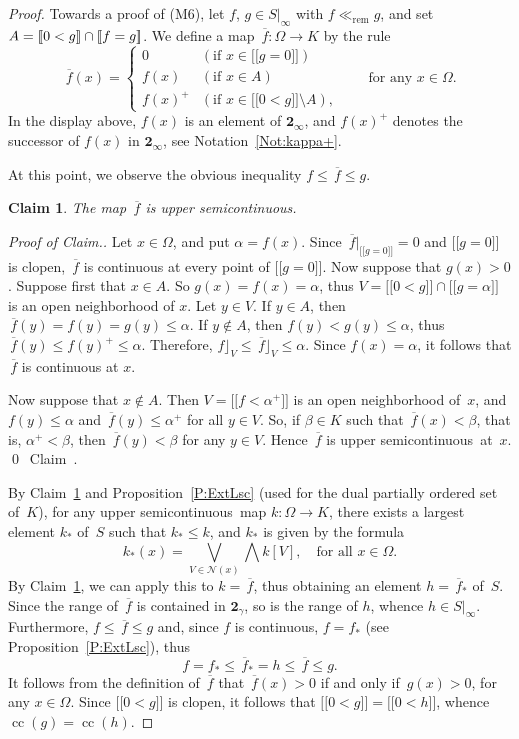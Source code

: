 \documentclass[psamsfonts,reqno]{memo-l}
\theoremstyle{plain}
\newtheorem{claim}{Claim}
\theoremstyle{definition}
\theoremstyle{remark}
\newcommand{\qedc}{{\qed}~{\rm Claim~{\theclaim}.}}
\newenvironment{cproof}
{\begin{proof}[Proof of Claim.]}
{\qedc\renewcommand{\qed}{}\end{proof}}
\numberwithin{equation}{section}
\newcommand{\two}{\mathbf{2}}
\newcommand{\Cn}{\mathbf{2}_{\infty}}
\newcommand{\Nh}{\mathcal{N}}
\renewcommand{\iff}{if and only if}
\newcommand{\ol}[1]{\,\overline{\!#1}}
\newcommand{\rem}{\ll_{\mathrm{rem}}}
\newcommand{\DI}[1]{#1|_{\infty}}
\newcommand{\usc}{upper semicontinuous}
\newcommand{\vbv}[1]{{[\![}#1{]\!]}}
\DeclareMathOperator{\cc}{cc}
\begin{document}
\begin{proof}
Towards a proof of (M6), let $f$, $g\in\DI{S}$ with $f\rem g$, and set
$A=\vbv{0\nobreak <\nobreak g}\cap\vbv{f\nobreak =\nobreak g}$.
We define a map $\ol{f}\colon\Omega\to K$ by
the rule
   \[
   \ol{f}(x)=
   \begin{cases}
   0&(\text{if }x\in\vbv{g=0})\\
   f(x)&(\text{if }x\in A)\\
   f(x)^+&(\text{if }x\in\vbv{0<g}\setminus A),
   \end{cases}
   \qquad\text{for any }x\in\Omega.
   \]
In the display above, $f(x)$ is an element of $\Cn$, and $f(x)^+$ denotes
the successor of $f(x)$ in $\Cn$, see Notation~\ref{Not:kappa+}.

At this point, we observe the obvious inequality $f\leq\ol{f}\leq g$.

\begin{claim}\label{Cl:olfusc}
The map $\ol{f}$ is \usc.
\end{claim}

\begin{cproof}
Let $x\in\Omega$, and put $\alpha=f(x)$. Since $\ol{f}|_{\vbv{g=0}}=0$ and
$\vbv{g=0}$ is clopen, $\ol{f}$ is continuous at every point of $\vbv{g=0}$.
Now suppose that $g(x)>0$. Suppose first that $x\in A$. So
$g(x)=f(x)=\alpha$, thus $V=\vbv{0<g}\cap\vbv{g=\alpha}$ is an open
neighborhood of $x$. Let $y\in V$. If $y\in A$, then
$\ol{f}(y)=f(y)=g(y)\leq\alpha$. If $y\notin A$, then $f(y)<g(y)\leq\alpha$,
thus $\ol{f}(y)\leq f(y)^+\leq\alpha$. Therefore,
$f\rfloor_V\leq\ol{f}\rfloor_V\leq\alpha$. Since $f(x)=\alpha$, it follows
that $\ol{f}$ is continuous at $x$.

Now suppose that $x\notin A$. Then $V=\vbv{f<\alpha^+}$ is an open
neighborhood of~$x$, and $f(y)\leq\alpha$ and $\ol{f}(y)\leq\alpha^+$ for
all $y\in V$. So, if $\beta\in K$ such that $\ol{f}(x)<\beta$, that is,
$\alpha^+<\beta$, then $\ol{f}(y)<\beta$ for any $y\in V$. Hence $\ol{f}$ is
\usc\ at~$x$.
\end{cproof}

By Claim~\ref{Cl:olfusc} and Proposition~\ref{P:ExtLsc} (used for the dual
partially ordered set of~$K$), for any \usc\ map $k\colon\Omega\to K$, there
exists a largest element $k_*$ of~$S$ such that $k_*\leq k$, and $k_*$ is
given by the formula
   \[
   k_*(x)=
   \bigvee_{V\in\Nh(x)}\bigwedge k[V],\quad\text{for all }x\in\Omega.
   \]
By Claim~\ref{Cl:olfusc}, we can apply this to $k=\ol{f}$, thus obtaining an
element $h=\ol{f}_*$ of~$S$.
Since the range of $\ol{f}$ is contained in $\two_\gamma$,
\index{Tzzgamma@$\two_\gamma$}
so is the range of $h$, whence $h\in\DI{S}$. Furthermore, $f\leq\ol{f}\leq g$
and, since $f$ is continuous, $f=f_*$ (see Proposition~\ref{P:ExtLsc}), thus
   \[
   f=f_*\leq\ol{f}_*=h\leq\ol{f}\leq g.
   \]
It follows from the definition of $\ol{f}$ that $\ol{f}(x)>0$ \iff\
$g(x)>0$, for any $x\in\Omega$. Since $\vbv{0<g}$ is clopen, it follows that
$\vbv{0<g}=\vbv{0<h}$, whence $\cc(g)=\cc(h)$.


\end{proof}
\end{document}
